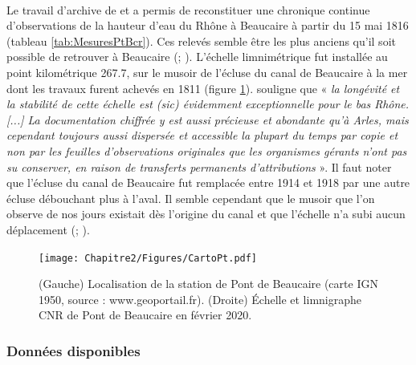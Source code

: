 	\paragraph{} Le travail d'archive de \citet{pichard_les_1995} et \citet{pichard_hydro-climatology_2017} a permis de reconstituer une chronique continue d'observations de la hauteur d'eau du Rhône à Beaucaire à partir du 15 mai 1816 (tableau \ref{tab:MesuresPtBcr}). Ces relevés semble être les plus anciens qu'il soit possible de retrouver à Beaucaire (\cite{parde_regime_1925}; \cite{pichard_les_1995}). L'échelle limnimétrique fut installée au point kilométrique 267.7, sur le musoir de l'écluse du canal de Beaucaire à la mer dont les travaux furent achevés en 1811 (figure \ref{fig:CartoPt}). \citet{pichard_hauteurs_2013} souligne que « \textit{la longévité et la stabilité de cette échelle est (sic) évidemment exceptionnelle pour le bas Rhône. [...] La documentation chiffrée y est aussi précieuse et abondante qu'à Arles, mais cependant toujours aussi dispersée et accessible la plupart du temps par copie et non par les feuilles d'observations originales que les organismes gérants n'ont pas su conserver, en raison de transferts permanents d'attributions} ». Il faut noter que l'écluse du canal de Beaucaire fut remplacée entre 1914 et 1918 par une autre écluse débouchant plus à l'aval. Il semble cependant que le musoir que l'on observe de nos jours existait dès l'origine du canal et que l'échelle n'a subi aucun déplacement (\cite{pichard_hauteurs_2013}; \cite{bard_actualisation_2018}). 
	
	\begin{figure}[h]
	\centering
		\texttt{[image: Chapitre2/Figures/CartoPt.pdf]}
        \caption{(Gauche) Localisation de la station de Pont de Beaucaire (carte IGN 1950, source : www.geoportail.fr). (Droite) Échelle et limnigraphe CNR de Pont de Beaucaire en février 2020.}	
		\label{fig:CartoPt}
	\end{figure}

\FloatBarrier

	\subsubsection{Données disponibles}
